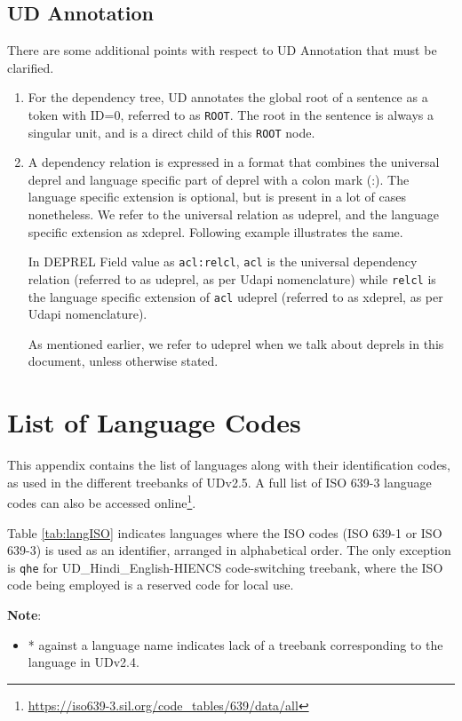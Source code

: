\subsection{UD Annotation}
\label{app:UDAnnotation}
There are some additional points with respect to UD Annotation that must be clarified.
\begin{enumerate}
    \item For the dependency tree, UD annotates the global root of a sentence as a token with ID=0, referred to as \verb|ROOT|. The root in the sentence is always a singular unit, and is a direct child of this \verb|ROOT| node. 
    \item A dependency relation is expressed in a format that combines the universal deprel and language specific part of deprel with a colon mark (:). The language specific extension is optional, but is present in a lot of cases nonetheless. We refer to the universal relation as udeprel, and the language specific extension as xdeprel. Following example illustrates the same.
    \begin{example}
    In DEPREL Field value as \verb|acl:relcl|, \verb|acl| is the universal dependency relation (referred to as udeprel, as per Udapi nomenclature) while \verb|relcl| is the language specific extension of \verb|acl| udeprel (referred to as xdeprel, as per Udapi nomenclature).
    \end{example}
    As mentioned earlier, we refer to udeprel when we talk about deprels in this document, unless otherwise stated.
\end{enumerate}
\newpage

\section{List of Language Codes}
\label{app:lang_codes}

This appendix contains the list of languages along with their identification codes, as used in the different treebanks of UDv2.5. A full list of ISO 639-3 language codes can also be accessed online\footnote{\url{https://iso639-3.sil.org/code_tables/639/data/all}}. 

Table \ref{tab:langISO} indicates languages where the ISO codes (ISO 639-1 or ISO 639-3) is used as an identifier, arranged in alphabetical order. The only exception is \verb|qhe| for UD\_Hindi\_English-HIENCS code-switching treebank, where the ISO code being employed is a reserved code for local use.

\textbf{Note}: 
\begin{itemize}
    \item * against a language name indicates lack of a treebank corresponding to the language in UDv2.4.
\end{itemize}


